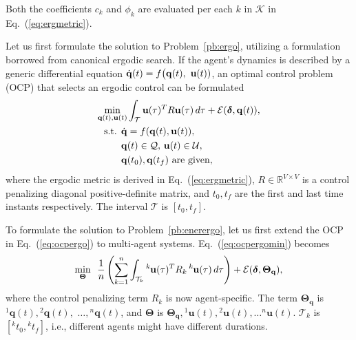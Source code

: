 \documentclass[letterpaper,10pt,conference,twoside]{IEEEtran}
\theoremstyle{definition}
\begin{document}
Both the coefficients $c_k$ and $\phi_k$ are evaluated per each $k$ in $\mathcal{K}$ in Eq.~(\ref{eq:ergmetric}).

Let us first formulate the solution to Problem~\ref{pb:ergo}, utilizing a formulation borrowed from canonical ergodic search.
If the agent's dynamics is described by a generic differential equation $\dot{\mathbf{q}}(t)=f\big({\small\mathbf{q}(t),}$ ${\small\mathbf{u}(t)})$, an optimal control problem (OCP) that selects an ergodic control can be formulated~\cite{ayvali2017ergodic}
\begin{subequations}\vspace*{-.4cm}\label{eq:ocpergo}\begin{align}
  \min_{\mathbf{q}(t),\mathbf{u}(t)}&\int_{\mathcal{T}}\mathbf{u}(\tau)^TR\mathbf{u}(\tau)\,d\tau+{\mathcal{E}(\boldsymbol{\delta},\mathbf{q}(t))},\label{eq:ocpergomin}\\
  \text{s.t. }\dot{\mathbf{q}}&=f(\mathbf{q}(t),\mathbf{u}(t)),\\
  \mathbf{q}&(t)\in\mathcal{Q},\,\mathbf{u}(t)\in\mathcal{U},\\
  \mathbf{q}&(t_0), \mathbf{q}(t_f)\text{ are given},\label{eq:ocpconsttotf}
\end{align}\end{subequations}
where the ergodic metric is derived in Eq.~(\ref{eq:ergmetric}), $R\in\mathbb{R}^{V\times V}$ is a control penalizing diagonal positive-definite matrix, and $t_0, t_f$ are the first and last time instants respectively. 
The interval $\mathcal{T}$ is $[t_0, t_f]$.%

To formulate the solution to Problem~\ref{pb:enerergo}, let us first extend the OCP in Eq.~(\ref{eq:ocpergo}) to multi-agent systems. Eq.~(\ref{eq:ocpergomin}) becomes
\begin{equation}\label{eq:ocpergomulti}
  \min_{\boldsymbol{\Theta}}\,\,\,{\frac{1}{n}\left(\sum_{k=1}^{n}\int_{\mathcal{T}_k}{}^k\hspace*{-.1ex}\mathbf{u}(\tau)^TR_k\,{}^k\hspace*{-.1ex}\mathbf{u}(\tau)\,d\tau\right)+\mathcal{E}(\boldsymbol{\delta},\boldsymbol{\Theta}_{\mathbf{q}})},
\end{equation}
where %
the control penalizing term $R_k$ %
is now agent-specific. The term $\boldsymbol{\Theta}_{\mathbf{q}}$ is ${}^1\mathbf{q}(t),{}^2\mathbf{q}(t),$ $\dots,{}^n\mathbf{q}(t)$, and $\boldsymbol{\Theta}$ is $\boldsymbol{\Theta}_{\mathbf{q}},{}^1\mathbf{u}(t),{}^2\mathbf{u}(t),\dots{}^n\mathbf{u}(t)$. $\mathcal{T}_k$ is $[{}^kt_0, {}^kt_f]$, i.e., different agents might have different durations.
\end{document}
